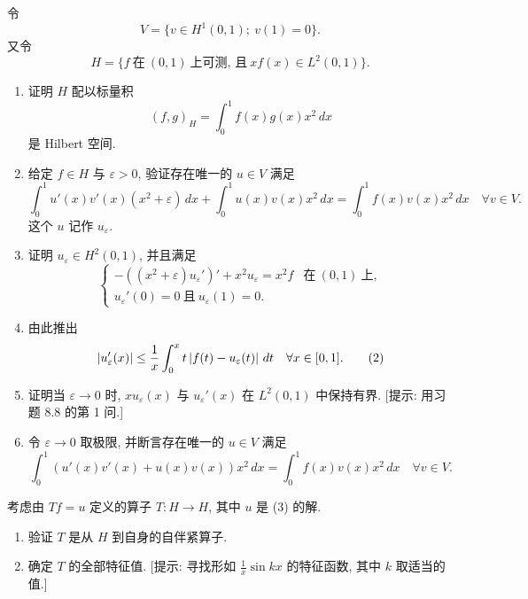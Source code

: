 \begin{exercise}
\label{exer:8.32}
令
\begin{equation*}
V=\{v\in H^1(0,1);\ v(1)=0\}.
\end{equation*}
又令
\begin{equation*}
H=\{f\ \text{在}\ (0,1)\ \text{上可测, 且}\ xf(x)\in L^2(0,1)\}.
\end{equation*}
\begin{enumerate}[label=\arabic*., leftmargin=2.2em, itemsep=0.3em]
	\item 证明 $H$ 配以标量积
	      \begin{equation*}
	      (f,g)_H=\int_0^1f(x)g(x)x^2\,dx
	      \end{equation*}
	      是 Hilbert 空间.
	\item 给定 $f\in H$ 与 $\varepsilon>0$, 验证存在唯一的 $u\in V$ 满足
	      \begin{equation*}
	      \int_0^1u'(x)v'(x)(x^2+\varepsilon)\,dx
	      +\int_0^1u(x)v(x)x^2\,dx
	      =\int_0^1f(x)v(x)x^2\,dx\quad\forall v\in V.
	      \end{equation*}
	      这个 $u$ 记作 $u_\varepsilon$.
	\item 证明 $u_\varepsilon\in H^2(0,1)$, 并且满足
	      \begin{equation}
	      \begin{cases}
	      -((x^2+\varepsilon)u_\varepsilon')'+x^2u_\varepsilon=x^2f
	      & \text{在}\ (0,1)\ \text{上},\\
	      u_\varepsilon'(0)=0\ \text{且}\ u_\varepsilon(1)=0.
	      \end{cases}
	      \tag{1}
	      \end{equation}
	\item 由此推出
	      \begin{equation}
	      \left|u_\varepsilon'(x)\right|\le\frac1x\int_0^xt\left|f(t)-u_\varepsilon(t)\right|\,dt
	      \quad\forall x\in[0,1].
	      \tag{2}
	      \end{equation}
	\item 证明当 $\varepsilon\to0$ 时, $xu_\varepsilon(x)$ 与
	      $u_\varepsilon'(x)$ 在 $L^2(0,1)$ 中保持有界.
	      [提示: 用习题 8.8 的第 1 问.]
	\item 令 $\varepsilon\to0$ 取极限, 并断言存在唯一的 $u\in V$ 满足
	      \begin{equation}
	      \int_0^1(u'(x)v'(x)+u(x)v(x))x^2\,dx
	      =\int_0^1f(x)v(x)x^2\,dx\quad\forall v\in V.
	      \tag{3}
	      \end{equation}
\end{enumerate}
考虑由 $Tf=u$ 定义的算子 $T:H\to H$, 其中 $u$ 是 (3) 的解.
\begin{enumerate}[label=\arabic*., leftmargin=2.2em, itemsep=0.3em, start=7]
	\item 验证 $T$ 是从 $H$ 到自身的自伴紧算子.
	\item 确定 $T$ 的全部特征值.
	      [提示: 寻找形如 $\frac1x\sin kx$ 的特征函数, 其中 $k$ 取适当的值.]
\end{enumerate}
\end{exercise}

